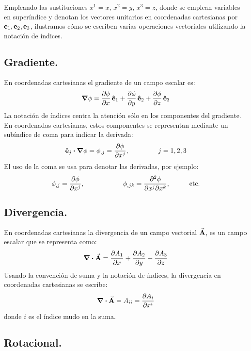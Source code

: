 \documentclass[hidelinks,12pt]{article}
\begin{document}
Empleando las sustituciones $x^{1} = x, \, x^{2} = y, \, x^{3} = z$, donde se emplean variables en superíndice y denotan los vectores unitarios en coordenadas cartesianas por $\vb{e}_{1}, \vb{e}_{2}, \vb{e}_{3}$, ilustramos cómo se escriben varias operaciones vectoriales utilizando la notación de índices.

\subsection{Gradiente.}


En coordenadas cartesianas el gradiente de un campo escalar es:
\begin{align*}
\grad{\phi} = \pdv{\phi}{x} \, \vu{e}_{1} + \pdv{\phi}{y} \, \vu{e}_{2} + \pdv{\phi}{z} \, \vu{e}_{3}
\end{align*}
La notación de índices centra la atención sólo en los componentes del gradiente. En coordenadas cartesianas, estos componentes se representan mediante un subíndice de coma para indicar la derivada:
\begin{align*}
\vu{e}_{j} \vdot \grad{\phi} = \phi_{,j} = \pdv{\phi}{x^{j}}, \hspace{1.5cm} j = 1, 2, 3
\end{align*}
El uso de la coma se usa para denotar las derivadas, por ejemplo:
\begin{align*}
\phi_{,j} = \pdv{\phi}{x^{j}}, \hspace{2cm} \phi_{,jk} = \pdv[2]{\phi}{x^{j}}{x^{k}}, \hspace{1cm} \text{etc.}
\end{align*}

\subsection{Divergencia.}

En coordenadas cartesianas la divergencia de un campo vectorial $\va{A}$, es un campo escalar que se representa como:
\begin{align*}
\div{\va{A}} = \pdv{A_{1}}{x} + \pdv{A_{2}}{y} + \pdv{A_{3}}{z}
\end{align*}
Usando la convención de suma y la notación de índices, la divergencia en coordenadas cartesianas se escribe:
\begin{align*}
\div{\va{A}} = A_{i i} = \pdv{A_{i}}{x^{i}}
\end{align*}
donde $i$ es el índice mudo en la suma.

\subsection{Rotacional.}
\end{document}
